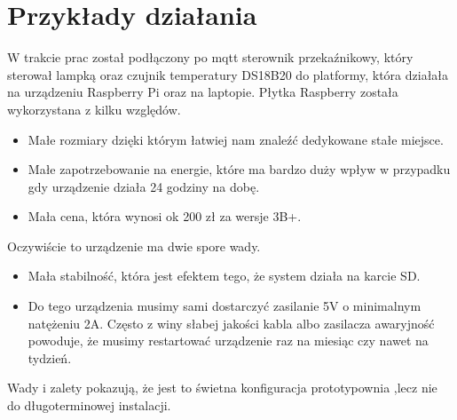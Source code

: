 \chapter{Przykłady działania}
W trakcie prac został podłączony po mqtt sterownik przekaźnikowy, który sterował lampką oraz czujnik temperatury DS18B20 do platformy, która działała na urządzeniu Raspberry Pi oraz na laptopie. Płytka Raspberry została wykorzystana z kilku względów. 
\begin{itemize}
    \item Małe rozmiary dzięki którym łatwiej nam znaleźć dedykowane stałe miejsce.
    \item Małe zapotrzebowanie na energie, które ma bardzo duży wpływ w przypadku gdy urządzenie działa 24 godziny na dobę.
    \item Mała cena, która wynosi ok 200 zł za wersje 3B+.
\end{itemize}
Oczywiście to urządzenie ma dwie spore wady.
\begin{itemize}
    \item Mała stabilność, która jest efektem tego, że system działa na karcie SD.
    \item Do tego urządzenia musimy sami dostarczyć zasilanie 5V o minimalnym natężeniu 2A. Często z winy słabej jakości kabla albo zasilacza awaryjność powoduje, że musimy restartować urządzenie raz na miesiąc czy nawet na tydzień.
\end{itemize}
Wady i zalety pokazują, że jest to świetna konfiguracja prototypownia ,lecz nie do długoterminowej instalacji.